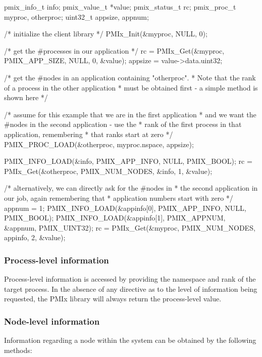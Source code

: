 \cspecificstart
\begin{codepar}
pmix_info_t info;
pmix_value_t *value;
pmix_status_t rc;
pmix_proc_t myproc, otherproc;
uint32_t appsize, appnum;

/* initialize the client library */
PMIx_Init(&myproc, NULL, 0);

/* get the #processes in our application */
rc = PMIx_Get(&myproc, PMIX_APP_SIZE, NULL, 0, &value);
appsize = value->data.uint32;

/* get the #nodes in an application containing "otherproc".
 * Note that the rank of a process in the other application
 * must be obtained first - a simple method is shown here */

/* assume for this example that we are in the first application
 * and we want the #nodes in the second application - use the
 * rank of the first process in that application, remembering
 * that ranks start at zero */
PMIX_PROC_LOAD(&otherproc, myproc.nspace, appsize);

PMIX_INFO_LOAD(&info, PMIX_APP_INFO, NULL, PMIX_BOOL);
rc = PMIx_Get(&otherproc, PMIX_NUM_NODES, &info, 1, &value);

/* alternatively, we can directly ask for the #nodes in
 * the second application in our job, again remembering that
 * application numbers start with zero */
appnum = 1;
PMIX_INFO_LOAD(&appinfo[0], PMIX_APP_INFO, NULL, PMIX_BOOL);
PMIX_INFO_LOAD(&appinfo[1], PMIX_APPNUM, &appnum, PMIX_UINT32);
rc = PMIx_Get(&myproc, PMIX_NUM_NODES, appinfo, 2, &value);

\end{codepar}
\cspecificend

\subsubsection{Process-level information}

Process-level information is accessed by providing the namespace and rank of the target process. In the absence of any directive as to the level of information being requested, the \ac{PMIx} library will always return the process-level value.

\subsubsection{Node-level information}

Information regarding a node within the system can be obtained by the following methods:

